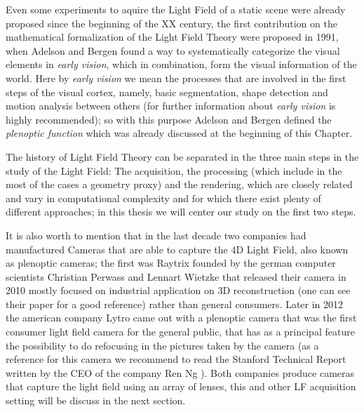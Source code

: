 \bigskip

Even some experiments to aquire the Light Field of a static scene were already proposed since the beginning of the XX century, the first contribution on the mathematical formalization of the Light Field Theory were proposed in 1991, when Adelson and Bergen \cite{AdelsonBergen} found a way to systematically categorize the visual elements in \textit{early vision}, which in combination, form the visual information of the world. Here by \textit{early vision} we mean the processes that are involved in the first steps of the visual cortex, namely, basic segmentation, shape detection and motion analysis between others (for further information about \textit{early vision} \cite{Tomasiearly} is highly recommended); so with this purpose Adelson and Bergen defined the \textit{plenoptic function} which was already discussed at the beginning of this Chapter. 

\bigskip

The history of Light Field Theory can be separated in the three main steps in the study of the Light Field: The acquisition, the processing (which include in the most of the cases a geometry proxy) and the rendering, which are closely related and vary in computational complexity and for which there exist plenty of different approaches; in this thesis we will center our study on the first two steps. 

\bigskip

It is also worth to mention that in the last decade two companies had manufactured Cameras that are able to capture the 4D Light Field, also known as plenoptic cameras; the first was Raytrix founded by the german computer scientists Christian Perwass and Lennart Wietzke that released their camera in 2010 mostly focused on industrial application on 3D reconstruction (one can see their paper \cite{Raytrix} for a good reference) rather than general consumers. Later in 2012 the american company Lytro came out with a plenoptic camera that was the first consumer light field camera for the general public, that has as a principal feature the possibility to do refocusing in the pictures taken by the camera (as a reference for this camera we recommend to read the Stanford Technical Report written by the CEO of the company Ren Ng \cite{Lytro}). Both companies produce cameras that capture the light field using an array of lenses, this and other LF acquisition setting will be discuss in the next section.

\bigskip


